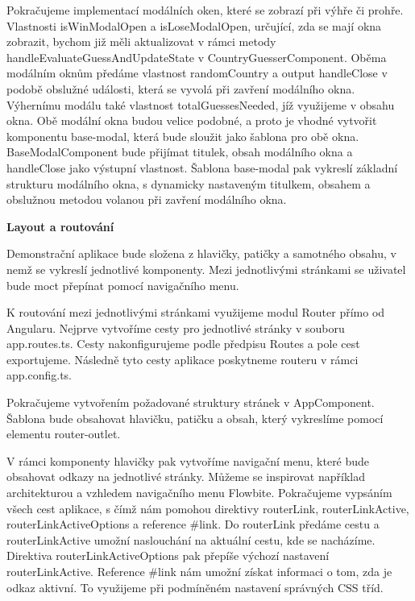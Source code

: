 Pokračujeme implementací modálních oken, které se zobrazí při výhře či prohře. 
Vlastnosti isWinModalOpen a isLoseModalOpen, určující, zda se mají okna zobrazit, bychom již měli aktualizovat v rámci metody handleEvaluateGuessAndUpdateState v CountryGuesserComponent. 
Oběma modálním oknům předáme vlastnost randomCountry a output handleClose v podobě obslužné události, která se vyvolá při zavření modálního okna. 
Výhernímu modálu také vlastnost totalGuessesNeeded, jíž využijeme v obsahu okna. 
Obě modální okna budou velice podobné, a proto je vhodné vytvořit komponentu base-modal, která bude sloužit jako šablona pro obě okna. 
BaseModalComponent bude přijímat titulek, obsah modálního okna a handleClose jako výstupní vlastnost. 
Šablona base-modal pak vykreslí základní strukturu modálního okna, s dynamicky nastaveným titulkem, obsahem a obslužnou metodou volanou při zavření modálního okna.

\begin{flushleft}
  \textbf{Layout a routování}
\end{flushleft}

Demonstrační aplikace bude složena z hlavičky, patičky a samotného obsahu, v nemž se vykreslí jednotlivé komponenty. 
Mezi jednotlivými stránkami se uživatel bude moct přepínat pomocí navigačního menu.

K routování mezi jednotlivými stránkami využijeme modul Router přímo od Angularu. Nejprve vytvoříme cesty pro jednotlivé stránky v souboru app.routes.ts. 
Cesty nakonfigurujeme podle předpisu Routes a pole cest exportujeme. Následně tyto cesty aplikace poskytneme routeru v rámci app.config.ts. 

Pokračujeme vytvořením požadované struktury stránek v AppComponent. Šablona bude obsahovat hlavičku, patičku a obsah, který vykreslíme pomocí elementu router-outlet. 

V rámci komponenty hlavičky pak vytvoříme navigační menu, které bude obsahovat odkazy na jednotlivé stránky. 
Můžeme se inspirovat například architekturou a vzhledem navigačního menu Flowbite. 
Pokračujeme vypsáním všech cest aplikace, s čímž nám pomohou direktivy routerLink, routerLinkActive, routerLinkActiveOptions a reference \#link. 
Do routerLink předáme cestu a routerLinkActive umožní naslouchání na aktuální cestu, kde se nacházíme. Direktiva routerLinkActiveOptions pak přepíše výchozí nastavení routerLinkActive.
Reference \#link nám umožní získat informaci o tom, zda je odkaz aktivní. To využijeme při podmíněném nastavení správných CSS tříd.

